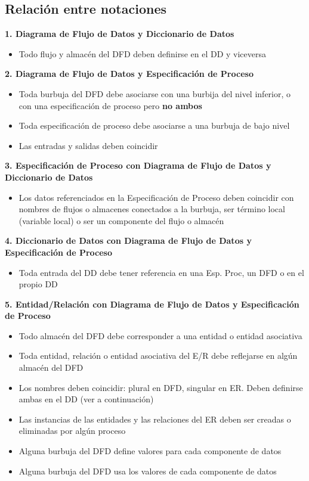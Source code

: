 \subsection{Relación entre notaciones}

\textbf{1. Diagrama de Flujo de Datos y Diccionario de Datos}

\begin{itemize}[noitemsep]
\item Todo flujo y almacén del DFD deben definirse en el DD y viceversa
\end{itemize}

\textbf{2. Diagrama de Flujo de Datos y Especificación de Proceso}

\begin{itemize}[noitemsep]
\item Toda burbuja del DFD debe asociarse con una burbija del nivel inferior, o con una especificación de proceso pero \textbf{no ambos}
\item Toda especificación de proceso debe asociarse a una burbuja de bajo nivel
\item Las entradas y salidas deben coincidir
\end{itemize}

\textbf{3. Especificación de Proceso con Diagrama de Flujo de Datos y Diccionario de Datos}

\begin{itemize}[noitemsep]
\item Los datos referenciados en la Especificación de Proceso deben coincidir con nombres de flujos o almacenes conectados a la burbuja, ser término local (variable local) o ser un componente del flujo o almacén
\end{itemize}

\textbf{4. Diccionario de Datos con Diagrama de Flujo de Datos y Especificación de Proceso}

\begin{itemize}[noitemsep]
\item Toda entrada del DD debe tener referencia en una Esp. Proc, un DFD o en el propio DD
\end{itemize}

\textbf{5. Entidad/Relación con Diagrama de Flujo de Datos y Especificación de Proceso}

\begin{itemize}[noitemsep]
\item Todo almacén del DFD debe corresponder a una entidad o entidad asociativa
\item Toda entidad, relación o entidad asociativa del E/R debe reflejarse en algún almacén del DFD
\item Los nombres deben coincidir: plural en DFD, singular en ER. Deben definirse ambas en el DD (ver a continuación)
\item Las instancias de las entidades y las relaciones del ER deben ser creadas o eliminadas por algún proceso
\item Alguna burbuja del DFD define valores para cada componente de datos
\item Alguna burbuja del DFD usa los valores de cada componente de datos
\end{itemize}

